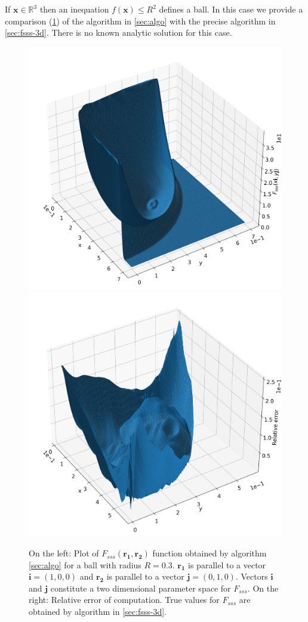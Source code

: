 \documentclass[reprint,amsmath,amssymb,aps,pre,showkeys,showpacs]{revtex4-1}
\begin{document}
If $\bm{x} \in \mathbb{R}^3$ then an inequation $f(\bm{x}) \le R^2$ defines a
ball. In this case we provide a comparison (\cref{fig:fsss-ball}) of the
algorithm in \cref{sec:algo} with the precise algorithm in
\cref{sec:fsss-3d}. There is no known analytic solution for this case.
\begin{figure}[!hpt]
  \centering
  \includegraphics[width=0.45\linewidth]{images/ball-sss.png}
  \hfill
  \includegraphics[width=0.45\linewidth]{images/ball-sss-error.png}
  \caption[]{On the left: Plot of $F_{sss}(\bm{r_1}, \bm{r_2})$ function
    obtained by algorithm \cref{sec:algo} for a ball with radius
    $R = 0.3$. $\bm{r_1}$ is parallel to a vector $\bm{i} = (1, 0, 0)$ and
    $\bm{r_2}$ is parallel to a vector $\bm{j} = (0, 1, 0)$. Vectors $\bm{i}$
    and $\bm{j}$ constitute a two dimensional parameter space for $F_{sss}$. On
    the right: Relative error of computation. True values for $F_{sss}$ are
    obtained by algorithm in \cref{sec:fsss-3d}.}
  \label{fig:fsss-ball}
\end{figure}
\end{document}
